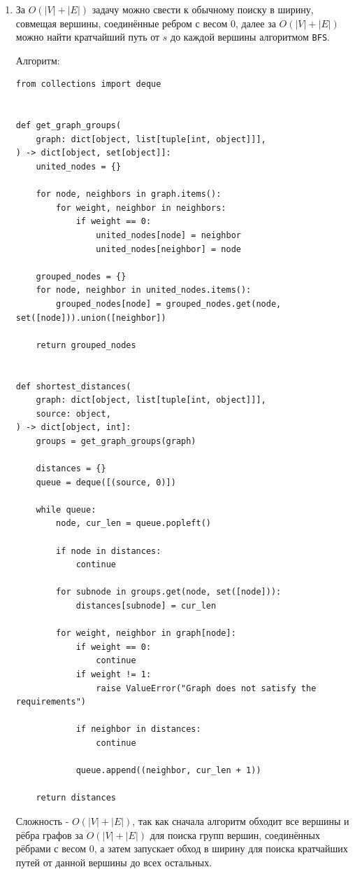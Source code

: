 \documentclass{article}
\begin{document}
\begin{enumerate}
	\item За $O(|V| + |E|)$ задачу можно свести к обычному
	      поиску в ширину, совмещая вершины, соединённые
	      ребром с весом $0$, далее за $O(|V| + |E|)$ можно
	      найти кратчайший путь от $s$ до каждой вершины
	      алгоритмом \texttt{BFS}.

	      Алгоритм:
	      \begin{lstlisting}
from collections import deque


def get_graph_groups(
	graph: dict[object, list[tuple[int, object]]],
) -> dict[object, set[object]]:
	united_nodes = {}

	for node, neighbors in graph.items():
		for weight, neighbor in neighbors:
			if weight == 0:
				united_nodes[node] = neighbor
				united_nodes[neighbor] = node

	grouped_nodes = {}
	for node, neighbor in united_nodes.items():
		grouped_nodes[node] = grouped_nodes.get(node, set([node])).union([neighbor])

	return grouped_nodes


def shortest_distances(
	graph: dict[object, list[tuple[int, object]]],
	source: object,
) -> dict[object, int]:
	groups = get_graph_groups(graph)

	distances = {}
	queue = deque([(source, 0)])

	while queue:
		node, cur_len = queue.popleft()

		if node in distances:
			continue

		for subnode in groups.get(node, set([node])):
			distances[subnode] = cur_len

		for weight, neighbor in graph[node]:
			if weight == 0:
				continue
			if weight != 1:
				raise ValueError("Graph does not satisfy the requirements")

			if neighbor in distances:
				continue

			queue.append((neighbor, cur_len + 1))

	return distances
	\end{lstlisting}
	      Сложность - $O(|V| + |E|)$, так как сначала алгоритм обходит
	      все вершины и рёбра графов за $O(|V| + |E|)$ для поиска
	      групп вершин, соединённых рёбрами с весом $0$, а затем
	      запускает обход в ширину для поиска кратчайших путей от
	      данной вершины до всех остальных.

\end{enumerate}
\end{document}
